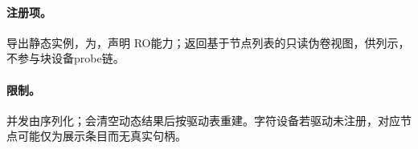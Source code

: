 \paragraph{注册项。}
导出静态实例，为，声明 RO能力；返回基于节点列表的只读伪卷视图，供列示，不参与块设备probe链。

\paragraph{限制。}
并发由序列化；会清空动态结果后按驱动表重建。字符设备若驱动未注册，对应节点可能仅为展示条目而无真实句柄。
